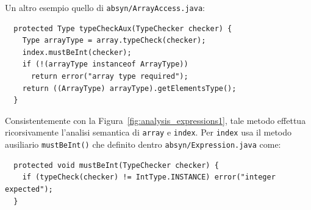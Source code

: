 Un altro esempio \e quello di \texttt{absyn/ArrayAccess.java}:
%
\begin{verbatim}
  protected Type typeCheckAux(TypeChecker checker) {
    Type arrayType = array.typeCheck(checker);
    index.mustBeInt(checker);
    if (!(arrayType instanceof ArrayType))
      return error("array type required");
    return ((ArrayType) arrayType).getElementsType();
  }
\end{verbatim}
%
Consistentemente con la Figura~\ref{fig:analysis_expressions1},
tale metodo effettua ricorsivamente l'analisi semantica di
\texttt{array} e \texttt{index}. Per \texttt{index} usa il metodo ausiliario
\texttt{mustBeInt()} che \e definito dentro \texttt{absyn/Expression.java}
come:
%
\begin{verbatim}
  protected void mustBeInt(TypeChecker checker) {
    if (typeCheck(checker) != IntType.INSTANCE) error("integer expected");
  }
\end{verbatim}

